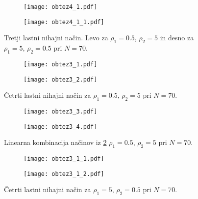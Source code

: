 \documentclass[12pt,a4paper]{article}
\begin{document}
\begin{figure}[H]
    \centering
    \begin{subfigure}[b]{0.49\textwidth}
        \texttt{[image: obtez4\_1.pdf]}
    \end{subfigure}
    \begin{subfigure}[b]{0.49\textwidth}
        \texttt{[image: obtez4\_1\_1.pdf]}
    \end{subfigure}
    \caption{Tretji lastni nihajni način. Levo za $\rho_1= 0.5$, $\rho_2=5$ in desno za $\rho_1= 5$, $\rho_2=0.5$ pri $N=70$.} \label{fig:slika21}
\end{figure}


\begin{figure}[H]
    \centering
    \begin{subfigure}[b]{0.49\textwidth}
        \texttt{[image: obtez3\_1.pdf]}
    \end{subfigure}
    \begin{subfigure}[b]{0.49\textwidth}
        \texttt{[image: obtez3\_2.pdf]}
    \end{subfigure}
    \caption{Četrti lastni nihajni način za $\rho_1= 0.5$, $\rho_2=5$ pri $N=70$.} \label{fig:slika22}
\end{figure}

\begin{figure}[H]
    \centering
    \begin{subfigure}[b]{0.49\textwidth}
        \texttt{[image: obtez3\_3.pdf]}
    \end{subfigure}
    \begin{subfigure}[b]{0.49\textwidth}
        \texttt{[image: obtez3\_4.pdf]}
    \end{subfigure}
    \caption{Linearna kombinacija načinov iz \ref{fig:slika22} $\rho_1= 0.5$, $\rho_2=5$ pri $N=70$.} \label{fig:slika23}
\end{figure}


\begin{figure}[H]
    \centering
    \begin{subfigure}[b]{0.49\textwidth}
        \texttt{[image: obtez3\_1\_1.pdf]}
    \end{subfigure}
    \begin{subfigure}[b]{0.49\textwidth}
        \texttt{[image: obtez3\_1\_2.pdf]}
    \end{subfigure}
    \caption{Četrti lastni nihajni način za $\rho_1= 5$, $\rho_2=0.5$ pri $N=70$.} \label{fig:slika24}
\end{figure}
\end{document}
